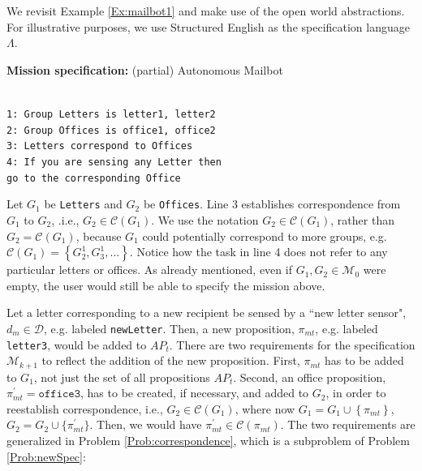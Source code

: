 \begin{myExample}\label{Ex:mailbot2}We revisit Example \ref{Ex:mailbot1} and make use of the open world abstractions. For illustrative purposes, we use Structured English \cite{JFRKGICRA12} as the specification language $\Lambda$.
\begin{algorithm}
\textbf{Mission specification:} (partial) Autonomous Mailbot
	
	\vspace{-6 pt}
	\hrulefill\\
	{\small
\texttt{1: Group Letters is letter1, letter2} \\
\texttt{2: Group Offices is office1, office2} \\
\texttt{3: Letters correspond to Offices} \\
\texttt{4: If you are sensing any Letter then}\\
\texttt{go to the corresponding Office}\\ 
}
\vspace{-10 pt}
\end{algorithm}

Let $G_1$ be \texttt{Letters} and $G_2$ be \texttt{Offices}. Line 3 establishes correspondence from $G_1$ to $G_2$, .i.e., $G_2 \in \mathcal{C}(G_1)$. We use the notation $G_2 \in \mathcal{C}(G_1)$, rather than $G_2 = \mathcal{C}(G_1)$, because $G_1$ could potentially correspond to more groups, e.g. $\mathcal{C}(G_1) = \left\{ G_2^1, G_3^1, \ldots\right\}$. 
Notice how the task in line 4 does not refer to any particular letters or offices. 
As already mentioned, even if $G_1, G_2 \in \mathcal{M}_0$ were empty, the user would still be able to specify the mission above.
\end{myExample}

Let a letter corresponding to a new recipient be sensed by a ``new letter sensor", $d_{m} \in \mathcal{D}$, e.g. labeled \texttt{newLetter}. Then, a new proposition, $\pi_{mt}$, e.g. labeled \texttt{letter3}, would be added to $AP_t$. 
There are two requirements for the specification $\mathcal{M}_{k+1}$ to reflect the addition of the new proposition. 
First, $\pi_{mt}$ has to be added to $G_1$, not just the set of all propositions $AP_t$. 
Second, an office proposition, $\pi_{mt}^\prime = \texttt{office3}$, has to be created, if necessary, and added to $G_2$, in order to reestablish correspondence, i.e., $G_2 \in \mathcal{C}(G_1)$, where now $G_{1} = G_1 \cup \left\{ \pi_{mt} \right\}$, $G_{2} = G_2 \cup \{ \pi_{mt}^\prime \}$. 
Then, we would have $\pi_{mt}^\prime \in \mathcal{C}(\pi_{mt})$. 
The two requirements are generalized in Problem \ref{Prob:correspondence}, which is a subproblem of Problem \ref{Prob:newSpec}:

